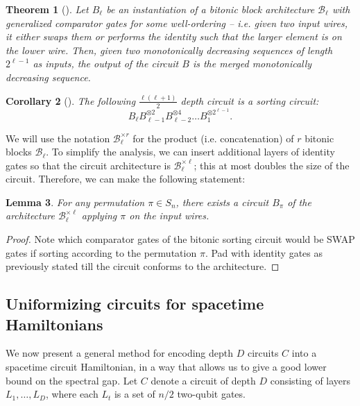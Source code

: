 \documentclass[11pt,letterpaper]{article}
\newtheorem{theorem}{Theorem}[section]
\newtheorem{lemma}[theorem]{Lemma}
\newtheorem{corollary}[theorem]{Corollary}
\theoremstyle{definition}
\theoremstyle{remark}
\newcommand{\cB}{\mathcal B}
\numberwithin{equation}{section}
\theoremstyle{definition}
\begin{document}
%

\begin{theorem}[\cite{Batcher:1968:SNA:1468075.1468121}]
Let $B_\ell$ be an instantiation of a bitonic block architecture $\cB_\ell$ with generalized comparator gates for some well-ordering -- i.e. given two input wires, it either swaps them or performs the identity such that the larger element is on the lower wire. Then, given two monotonically decreasing sequences of length $2^{\ell - 1}$ as inputs, the output of the circuit $B$ is the merged monotonically decreasing sequence. 
\end{theorem}

\begin{corollary}[\cite{Batcher:1968:SNA:1468075.1468121}]
The following $\frac{\ell(\ell + 1)}{2}$ depth circuit is a sorting circuit:
\begin{equation}
B_\ell B_{\ell - 1}^{\otimes 2} B_{\ell - 2}^{\otimes 4} \ldots B_1^{\otimes 2^{\ell - 1}}.
\end{equation}
\end{corollary}

We will use the notation $\cB_\ell^{\times r}$ for the product (i.e. concatenation) of $r$ bitonic blocks $\cB_\ell$. To simplify the analysis, we can insert additional layers of identity gates so that the circuit architecture is $\cB_\ell^{\times \ell}$; this at most doubles the size of the circuit. Therefore, we can make the following statement:

\begin{lemma}
For any permutation $\pi \in S_n$, there exists a circuit $B_\pi$ of the architecture $\cB_\ell^{\times \ell}$ applying $\pi$ on the input wires.
\label{lem:permforspaciallylocal}
\end{lemma}

\begin{proof}
Note which comparator gates of the bitonic sorting circuit would be SWAP gates if sorting according to the permutation $\pi$. Pad with identity gates as previously stated till the circuit conforms to the architecture.
\end{proof}

\subsection{Uniformizing circuits for spacetime Hamiltonians}
\label{subsec:uniformizing}

We now present a general method for encoding depth $D$ circuits $C$ into a spacetime circuit Hamiltonian, in a way that allows us to give a good lower bound on the spectral gap. Let $C$ denote a circuit of depth $D$ consisting of layers $L_1,\ldots,L_{D}$, where each $L_t$ is a set of $n/2$ two-qubit gates.
\end{document}
